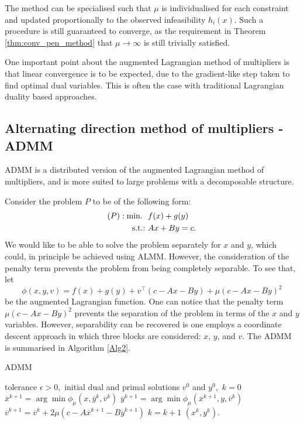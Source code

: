 The method can be specialised such that $\mu$ is individualised for each constraint and updated proportionally to the observed infeasibility $h_i(x)$. Such a procedure is still guaranteed to converge, as the requirement in Theorem \ref{thm:conv_pen_method} that $\mu \rightarrow \infty$ is still trivially satisfied.

One important point about the augmented Lagrangian method of multipliers is that linear convergence is to be expected, due to the gradient-like step taken to find optimal dual variables. This is often the case with traditional Lagrangian duality based approaches.


\subsection{Alternating direction method of multipliers - ADMM}

ADMM is a distributed version of the augmented Lagrangian method of multipliers, and is more suited to large problems with a decomposable structure. 

Consider the problem $P$ to be of the following form:
%
\begin{align*}
(P) : \mathop{\text{min.~}} \ & f(x) + g(y) \\
\mathop{\text{s.t.:~}} &Ax + By = c.    
\end{align*}
%
We would like to be able to solve the problem separately for $x$ and $y$, which could, in principle be achieved using ALMM. However, the consideration of the penalty term prevents the problem from being completely separable. To see that, let
$$ 
\phi(x,y,v) = f(x) + g(y) + v^\top(c - Ax - By) + \mu(c - Ax - By)^2
$$
be the augmented Lagrangian function. One can notice that the penalty term $\mu(c - Ax - By)^2$ prevents the separation of the problem in terms of the $x$ and $y$ variables. However, separability can be recovered is one employs a coordinate descent approach in which three blocks are considered: $x$, $y$, and $v$. The ADMM is summarised in Algorithm \ref{Alg2}.

\begin{algorithm}[H]
\caption{ADMM} \label{Alg2}
\begin{algorithmic}[1] %
 tolerance $\epsilon > 0,$ initial dual and primal solutions $v^0$ and $y^0,$ $k = 0$ 
 \label{stop_criteria}
        \State $\overline{x}^{k+1} = \arg\min \phi_\mu(x, \overline{y}^k ,\overline{v}^k)$ \label{x-step}
        \State $\overline{y}^{k+1} = \arg\min \phi_\mu(\overline{x}^{k+1}, y, \overline{v}^k)$  \label{y-step}
        \State $\overline{v}^{k+1} = \overline{v}^{k} + 2\mu (c - A\overline{x}^{k+1} - B\overline{y}^{k+1})$ \label{dual-step}
    \State $k = k+1$
\EndWhile
{} $(x^k, y^k)$.
\end{algorithmic}
\end{algorithm}

